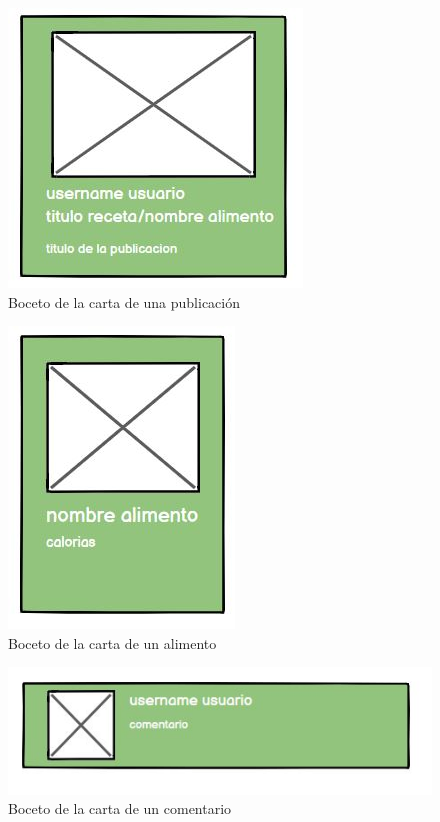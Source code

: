 \begin{figure}[H]
    \centering
    \includegraphics{img/carta-publicacion.jpg}
    \caption{Boceto de la carta de una publicación}
    \label{fig:carta-publicacion}
\end{figure}




\begin{figure}[H]
    \centering
    \includegraphics{img/carta-alimento.jpg}
    \caption{Boceto de la carta de un alimento}
    \label{fig:carta-alimento}
\end{figure}



\begin{figure}[H]
    \centering
    \includegraphics{img/carta-comentario.jpg}
    \caption{Boceto de la carta de un comentario}
    \label{fig:carta-comentario}
\end{figure}





